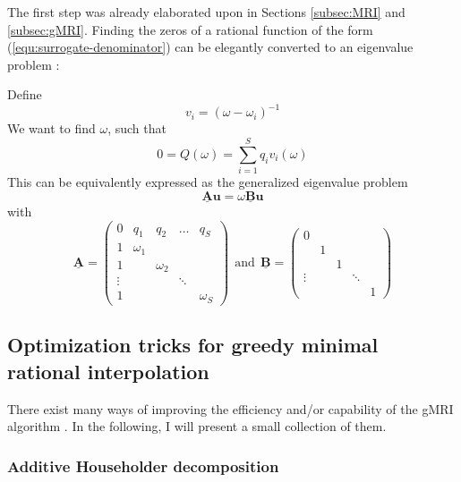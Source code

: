 \documentclass[11pt, a4paper]{article}
\begin{document}
The first step was already elaborated upon in Sections \ref{subsec:MRI} and \ref{subsec:gMRI}.
Finding the zeros of a rational function of the form (\ref{equ:surrogate-denominator})
can be elegantly converted to an eigenvalue problem \citep{klein}:

Define
\begin{equation}
    v_i = (\omega - \omega_i)^{-1}
\end{equation}
We want to find $\omega$, such that
\begin{equation}
    0 = Q(\omega) = \sum_{i=1}^S q_i v_i(\omega)
\end{equation}
This can be equivalently expressed as the generalized eigenvalue problem
\begin{equation}
    \mathbf{\underline{A}} \mathbf{u} = \omega \mathbf{\underline{B}} \mathbf{u} \label{equ:eigenvalue-problem}
\end{equation}
with
\begin{equation}
    \mathbf{\underline{A}} = \begin{pmatrix}
        0 & q_1 & q_2 & \dots & q_S \\
        1 & \omega_1 & & & \\
        1 & & \omega_2 & & \\ 
        \vdots & & & \ddots & \\ 
        1 & & & & \omega_S
    \end{pmatrix} ~~\text{and}~~
    \mathbf{\underline{B}} = \begin{pmatrix}
        0 & & & & \\
         & 1 & & & \\
         & & 1 & & \\ 
        \vdots & & & \ddots & \\ 
         & & & & 1
    \end{pmatrix}\label{equ:root-finding}
\end{equation}

\subsection{Optimization tricks for greedy minimal rational interpolation}
\label{subsec:optimization}

There exist many ways of improving the efficiency and/or capability of the
\acrshort{gMRI} algorithm \cite{davidePHD}. In the following, I will present
a small collection of them.

\subsubsection{Additive Householder decomposition}
\label{subsubsec:householder}
\end{document}

